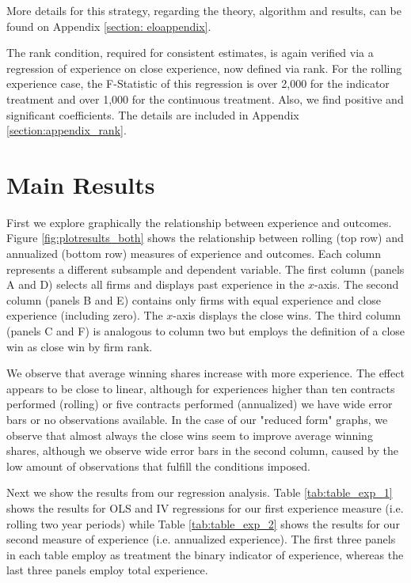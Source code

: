 More details for this strategy, regarding the theory, algorithm and results, can be found on Appendix \ref{section: eloappendix}.

The rank condition, required for consistent estimates, is again verified via a regression of experience on close experience, now defined via rank. For the rolling experience case, the F-Statistic of this regression is over 2,000 for the indicator treatment and over 1,000 for the continuous treatment. Also, we find positive and significant coefficients. The details are included in Appendix \ref{section:appendix_rank}.

\section{Main Results}
\label{section:main_results}
First we explore graphically the relationship between experience and outcomes. Figure \ref{fig:plotresults_both} shows the relationship between rolling (top row) and annualized (bottom row) measures of experience and outcomes.  Each column represents a different subsample and dependent variable. The first column (panels A and D) selects all firms and displays past experience in the $x$-axis. The second column (panels B and E) contains only firms with equal experience and close experience (including zero). The $x$-axis displays the close wins. The third column (panels C and F) is analogous to column two but employs the definition of a close win as close win by firm rank.

We observe that average winning shares increase with more experience. The effect appears to be close to linear, although for experiences higher than ten contracts performed (rolling) or five contracts performed (annualized) we have wide error bars or no observations available. In the case of our "reduced form" graphs, we observe that almost always the close wins seem to improve average winning shares, although we observe wide error bars in the second column, caused by the low amount of observations that fulfill the conditions imposed.

Next we show the results from our regression analysis. Table \ref{tab:table_exp_1} shows the results for OLS and IV regressions for our first experience measure (i.e. rolling two year periods) while Table \ref{tab:table_exp_2} shows the results for our second measure of experience (i.e. annualized experience). The first three panels in each table employ as treatment the binary indicator of experience, whereas the last three panels employ total experience.

